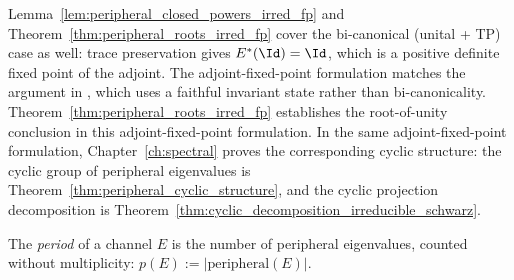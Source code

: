 \begin{remark}\label{rem:adjoint_fp_more_general}\leanok
    Lemma~\ref{lem:peripheral_closed_powers_irred_fp}
    and Theorem~\ref{thm:peripheral_roots_irred_fp}
    cover the bi-canonical (unital + TP) case as well:
    trace preservation gives
    $E^*(\Id)=\Id$, which is a positive definite fixed
    point of the adjoint.
    The adjoint-fixed-point formulation matches the
    argument in \cite[Appendix~A]{Cirac2016MPDO_arXiv},
    which uses a faithful invariant state rather than
    bi-canonicality.
    Theorem~\ref{thm:peripheral_roots_irred_fp} establishes the
    root-of-unity conclusion in this adjoint-fixed-point formulation.
    In the same adjoint-fixed-point formulation, Chapter~\ref{ch:spectral}
    proves the corresponding cyclic structure: the cyclic group of
    peripheral eigenvalues is Theorem~\ref{thm:peripheral_cyclic_structure},
    and the cyclic projection decomposition is
    Theorem~\ref{thm:cyclic_decomposition_irreducible_schwarz}.
\end{remark}

\begin{definition}\label{def:channel_period}
    \leanok
    The \emph{period} of a channel $E$ is the number of
    peripheral eigenvalues, counted without multiplicity:
    $p(E):=|\mathrm{peripheral}(E)|$.
\end{definition}
